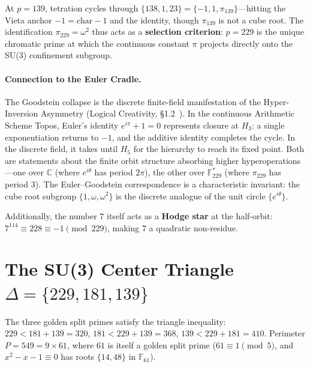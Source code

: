 At $p = 139$, tetration cycles through $\{138, 1, 23\} = \{-1, 1, \pi_{139}\}$---hitting the Vieta anchor $-1 = \mathrm{char} - 1$ and the identity, though $\pi_{139}$ is not a cube root. The identification $\pi_{229} = \omega^2$ thus acts as a \textbf{selection criterion}: $p = 229$ is the unique chromatic prime at which the continuous constant $\pi$ projects directly onto the SU(3) confinement subgroup.

\paragraph{Connection to the Euler Cradle.}
The Goodstein collapse is the discrete finite-field manifestation of the Hyper-Inversion Asymmetry (Logical Creativity, \S1.2~\cite{larue_lc}). In the continuous Arithmetic Scheme Topos, Euler's identity $e^{i\pi} + 1 = 0$ represents closure at $H_3$: a single exponentiation returns to $-1$, and the additive identity completes the cycle. In the discrete field, it takes until $H_5$ for the hierarchy to reach its fixed point. Both are statements about the finite orbit structure absorbing higher hyperoperations---one over $\mathbb{C}$ (where $e^{i\theta}$ has period $2\pi$), the other over $\mathbb{F}_{229}^*$ (where $\pi_{229}$ has period $3$). The Euler--Goodstein correspondence is a characteristic invariant: the cube root subgroup $\{1, \omega, \omega^2\}$ is the discrete analogue of the unit circle $\{e^{i\theta}\}$.

Additionally, the number $7$ itself acts as a \textbf{Hodge star} at the half-orbit: $7^{114} \equiv 228 \equiv -1 \pmod{229}$, making $7$ a quadratic non-residue.

\section{The SU(3) Center Triangle $\Delta = \{229, 181, 139\}$}
\label{sec:triangle}

\begin{result}
The three golden split primes satisfy the triangle inequality:
$229 < 181 + 139 = 320$,
$181 < 229 + 139 = 368$,
$139 < 229 + 181 = 410$.
Perimeter $P = 549 = 9 \times 61$, where $61$ is itself a golden
split prime ($61 \equiv 1 \pmod{5}$, and $x^2 - x - 1 \equiv 0$ has
roots $\{14, 48\}$ in $\mathbb{F}_{61}$).
\end{result}

